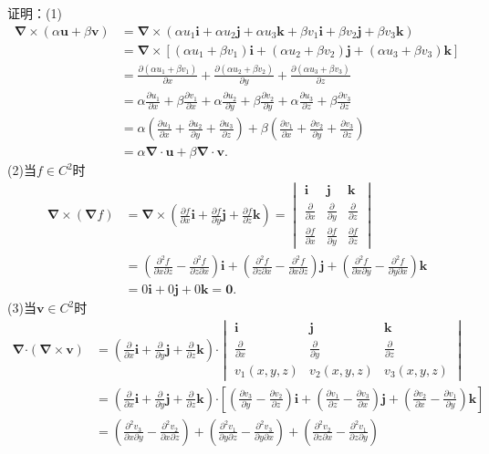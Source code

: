 \documentclass[12pt,UTF8,fleqn]{ctexart}
\newcommand{\pp}[2]{\frac{\partial #1}{\partial #2}}
\begin{document}
\begin{enumerate}
证明：(1)\[\begin{split}
\bm\nabla\times(\alpha\bm u+\beta\bm v)&=\bm\nabla\times(\alpha u_1\bm i+\alpha u_2\bm j+\alpha u_3\bm k+\beta v_1\bm i+\beta v_2\bm j+\beta v_3\bm k)\\
&=\bm\nabla\times[(\alpha u_1+\beta v_1)\bm i+(\alpha u_2+\beta v_2)\bm j+(\alpha u_3+\beta v_3)\bm k]\\
&=\pp{(\alpha u_1+\beta v_1)}x+\pp{(\alpha u_2+\beta v_2)}y+\pp{(\alpha u_3+\beta v_3)}z\\
&=\alpha\pp{u_1}x+\beta\pp{v_1}x+\alpha\pp{u_2}y+\beta\pp{v_2}y+\alpha\pp{u_3}z+\beta\pp{v_3}z\\
&=\alpha(\pp{u_1}x+\pp{u_2}y+\pp{u_3}z)+\beta(\pp{v_1}x+\pp{v_2}y+\pp{v_3}z)\\
&=\alpha\bm\nabla\cdot\bm u+\beta\bm\nabla\cdot\bm v.
\end{split}\]
(2)当$f\in C^2$时
\[\begin{split}
\bm\nabla\times(\bm\nabla f)&=\bm\nabla\times(\pp fx\bm i+\pp fy\bm j+\pp fz\bm k)=\begin{vmatrix}
\bm i&\bm j&\bm k\\
\pp{}x&\pp{}y&\pp{}z\\
\pp fx&\pp fy&\pp fz
\end{vmatrix}\\
&=(\frac{\partial^2f}{\partial x\partial z}-\frac{\partial^2f}{\partial z\partial x})\bm i+(\frac{\partial^2f}{\partial z\partial x}-\frac{\partial^2f}{\partial x\partial z})\bm j+(\frac{\partial^2f}{\partial x\partial y}-\frac{\partial^2f}{\partial y\partial x})\bm k\\
&=0\bm i+0\bm j+0\bm k=\bm0.
\end{split}\]
(3)当$\bm v\in C^2$时
\[\begin{split}
\bm\nabla\bm\cdot(\bm\nabla\times\bm v)&=(\pp{}x\bm i+\pp{}y\bm j+\pp{}z\bm k)\bm\cdot\begin{vmatrix}
\bm i&\bm j&\bm k\\
\pp{}x&\pp{}y&\pp{}z\\
v_1(x,y,z)&v_2(x,y,z)&v_3(x,y,z)
\end{vmatrix}\\
&=(\pp{}x\bm i+\pp{}y\bm j+\pp{}z\bm k)\bm\cdot[(\pp{v_3}y-\pp{v_2}z)\bm i+(\pp{v_1}z-\pp{v_3}x)\bm j+(\pp{v_2}x-\pp{v_1}y)\bm k]\\
&=(\frac{\partial^2 v_3}{\partial x\partial y}-\frac{\partial^2 v_2}{\partial x\partial z})+(\frac{\partial^2 v_1}{\partial y\partial  z}-\frac{\partial^2 v_3}{\partial y\partial x})+(\frac{\partial^2 v_2}{\partial z\partial x}-\frac{\partial^2 v_1}{\partial z\partial y})\\

\end{split}\]
\end{enumerate}
\end{document}
